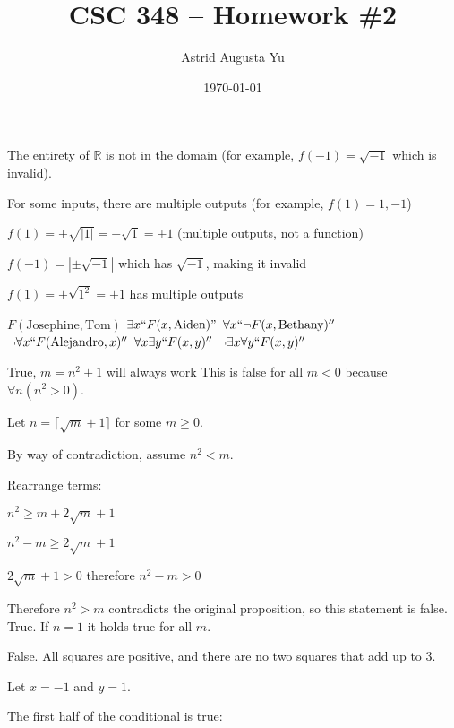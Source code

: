 \documentclass{article}
\author{Astrid Augusta Yu}
\title{CSC 348 -- Homework \#2}
\date{\today}
\begin{document}
\maketitle
\begin{outline}[enumerate]

    \1
        \2 The entirety of $\mathbb{R}$ is not in the domain (for example, $f(-1) = \sqrt{-1}$ which is invalid).

        \2 For some inputs, there are multiple outputs (for example, $f(1) = 1, -1$)

        \2 $f(1) = \pm \sqrt{|1|} = \pm \sqrt{1} = \pm 1$ (multiple outputs, not a function)
        
        \2 $f(-1) = |\pm \sqrt{-1} |$ which has $\sqrt{-1}$, making it invalid

        \2 $f(1) =\pm \sqrt{1^2} = \pm 1$ has multiple outputs
    
    \1
        \2 $F(\text{Josephine}, \text{Tom})$
        \2 $\exists x ``F(x, \text{Aiden})"$
        \2 $\forall x ``\neg F(x, \text{Bethany})''$
        \2 $\neg \forall x ``F(\text{Alejandro}, x)''$
        \2 $\forall x \exists y ``F(x, y)''$
        \2 $\neg \exists x \forall y ``F(x, y)''$
    
    \1
        \2 True, $m = n^2 + 1$ will always work
        \2 This is false for all $m < 0$ because $\forall n (n^2 > 0)$. 
        
        Let $n = \lceil \sqrt{m} + 1 \rceil$ for some $m \geq 0$. 
        
        By way of contradiction, assume $n^2 < m$.

        Rearrange terms:

        \centering
        
        $n^2 \geq m + 2 \sqrt{m} + 1$

        $n^2 - m \geq 2 \sqrt{m} + 1$

        \raggedright

        $2 \sqrt{m} + 1 > 0$ therefore $n^2 - m > 0$

        Therefore $n^2 > m$ contradicts the original proposition, so this statement is false.
        \2 True. If $n = 1$ it holds true for all $m$.

        \2 False. All squares are positive, and there are no two squares that add up to 3.

    \1
        \2 Let $x = -1$ and $y = 1$. 

            \raggedright
            The first half of the conditional is true:
            

\end{outline}
\end{document}
